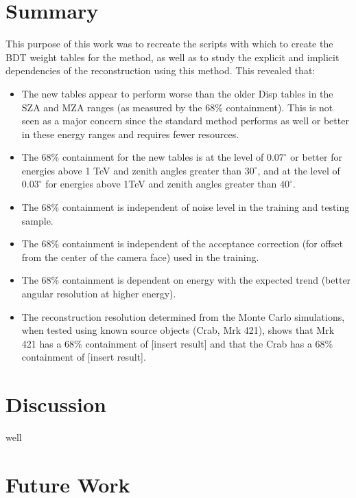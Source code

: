 \documentclass[main.tex]{subfiles}
\begin{document}
\section{Summary}
This purpose of this work was to recreate the scripts with which to create the BDT weight tables for the \disp method, as well as to study the explicit and implicit dependencies of the reconstruction using this method. This revealed that:

\begin{itemize}
\item The new \disp tables appear to perform worse than the older Disp tables in the SZA and MZA ranges (as measured by the 68\% containment). This is not seen as a major concern since the standard method performs as well or better in these energy ranges and requires fewer resources.
\item The 68\% containment for the new \disp tables is at the level of $0.07^\circ$ or better for energies above 1 TeV and zenith angles greater than $30^\circ$, and at the level of $0.03^\circ$ for energies above 1TeV and zenith angles greater than $40^\circ$.
\item The 68\% containment is independent of noise level in the training and testing sample.
\item The 68\% containment is independent of the acceptance correction (for offset from the center of the camera face) used in the training.
\item The 68\% containment is dependent on energy with the expected trend (better angular resolution at higher energy).
\item The reconstruction resolution determined from the Monte Carlo simulations, when tested using known source objects (Crab, Mrk 421), shows that Mrk 421 has a 68\% containment of [insert result] and that the Crab has a 68\% containment of [insert result].

\end{itemize}

\section{Discussion}
well

\section{Future Work}
\end{document}
